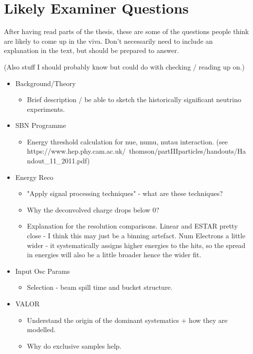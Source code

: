 \chapter{Likely Examiner Questions}\label{Likely Examiner Questions}

After having read parts of the thesis, these are some of the questions people think are likely to come up in the viva. Don't necessarily need to include an explanation in the text, but should be prepared to answer.

(Also stuff I should probably know but could do with checking / reading up on.)

\begin{itemize}
    \item Background/Theory
    \begin{itemize}
        \item Brief description / be able to sketch the historically significant neutrino experiments.
    \end{itemize}
    
    \item SBN Programme
    \begin{itemize}
        \item Energy threshold calculation for nue, numu, nutau interaction. (see https://www.hep.phy.cam.ac.uk/~thomson/partIIIparticles/handouts/Handout\_11\_2011.pdf)
    \end{itemize}
    
    \item Energy Reco
    \begin{itemize}
        \item "Apply signal processing techniques" - what are these techniques?
        \item Why the deconvolved charge drops below 0?
        \item Explanation for the resolution comparisons. Linear and ESTAR pretty close - I think this may just be a binning artefact. Num Electrons a little wider - it systematically assigns higher energies to the hits, so the spread in energies will also be a little broader hence the wider fit. 
    \end{itemize}
    
    \item Input Osc Params
    \begin{itemize}
        \item Selection - beam spill time and bucket structure.
    \end{itemize}
    
    \item VALOR
    \begin{itemize}
        \item Understand the origin of the dominant systematics + how they are modelled. 
        \item Why do exclusive samples help. 
    \end{itemize}
\end{itemize}